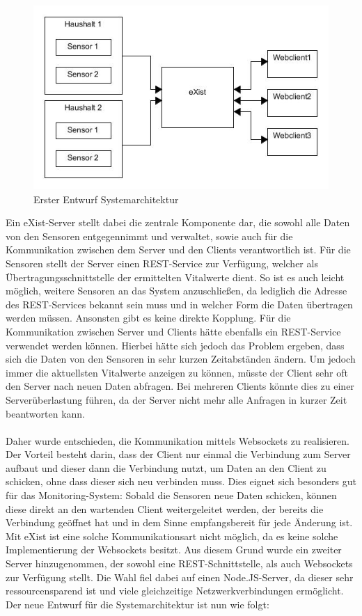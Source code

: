 \begin{figure}[h]
\begin{center}
\includegraphics[scale=0.55]{images/sa1.jpg} 
\caption{Erster Entwurf Systemarchitektur}
\end{center}
\end{figure}

\newpage
Ein eXist-Server stellt dabei die zentrale Komponente dar, die sowohl alle Daten von den Sensoren entgegennimmt und verwaltet, sowie auch für die Kommunikation zwischen dem Server und den Clients verantwortlich ist. Für die Sensoren stellt der Server einen REST-Service zur Verfügung, welcher als Übertragungsschnittstelle der ermittelten Vitalwerte dient. So ist es auch leicht möglich, weitere Sensoren an das System anzuschließen, da lediglich die Adresse des REST-Services bekannt sein muss und in welcher Form die Daten übertragen werden müssen. Ansonsten gibt es keine direkte Kopplung. Für die Kommunikation zwischen Server und Clients hätte ebenfalls ein REST-Service verwendet werden können. Hierbei hätte sich jedoch das Problem ergeben, dass sich die Daten von den Sensoren in sehr kurzen Zeitabständen ändern. Um jedoch immer die aktuellsten Vitalwerte anzeigen zu können, müsste der Client sehr oft den Server nach neuen Daten abfragen. Bei mehreren Clients könnte dies zu einer Serverüberlastung führen, da der Server nicht mehr alle Anfragen in kurzer Zeit beantworten kann.
\\
\\
Daher wurde entschieden, die Kommunikation mittels Websockets zu realisieren. Der Vorteil besteht darin, dass der Client nur einmal die Verbindung zum Server aufbaut und dieser dann die Verbindung nutzt, um Daten an den Client zu schicken, ohne dass dieser sich neu verbinden muss. Dies eignet sich besonders gut für das Monitoring-System: Sobald die Sensoren neue Daten schicken, können diese direkt an den wartenden Client weitergeleitet werden, der bereits die Verbindung geöffnet hat und in dem Sinne empfangsbereit für jede Änderung ist. Mit eXist ist eine solche Kommunikationsart nicht möglich, da es keine solche Implementierung der Websockets besitzt. Aus diesem Grund wurde ein zweiter Server hinzugenommen, der sowohl eine REST-Schnittstelle, als auch Websockets zur Verfügung stellt. Die Wahl fiel dabei auf einen Node.JS-Server, da dieser sehr ressourcensparend ist und viele gleichzeitige Netzwerkverbindungen ermöglicht. Der neue Entwurf für die Systemarchitektur ist nun wie folgt:

